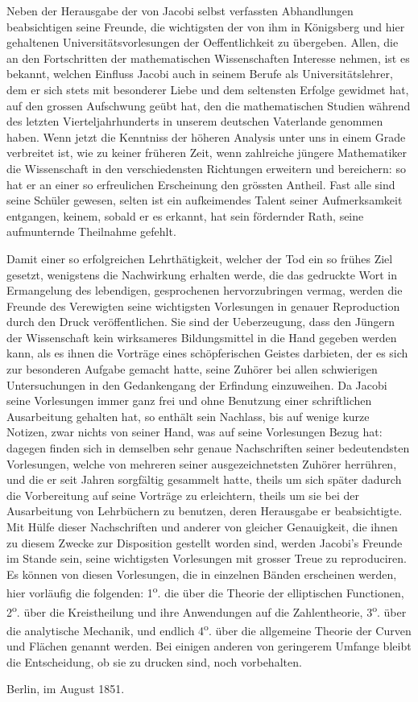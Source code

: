 \documentclass[11pt]{article}
\begin{document}
Neben der Herausgabe der von Jacobi selbst verfassten Abhandlungen beabsichtigen seine Freunde, die wichtigsten der von ihm in Königsberg und hier gehaltenen Universitätsvorlesungen der Oeffentlichkeit zu übergeben. Allen, die an den Fortschritten der mathematischen Wissenschaften Interesse nehmen, ist es bekannt, welchen Einfluss Jacobi auch in seinem Berufe als Universitätslehrer, dem er sich stets mit besonderer Liebe und dem seltensten Erfolge gewidmet hat, auf den grossen Aufschwung geübt hat, den die mathematischen Studien während des letzten Vierteljahrhunderts in unserem deutschen Vaterlande genommen haben. Wenn jetzt die Kenntniss der höheren Analysis unter uns in einem Grade verbreitet ist, wie zu keiner früheren Zeit, wenn zahlreiche jüngere Mathematiker die Wissenschaft in den verschiedensten Richtungen erweitern und bereichern: so hat er an einer so erfreulichen Erscheinung den grössten Antheil. Fast alle sind seine Schüler gewesen, selten ist ein aufkeimendes Talent seiner Aufmerksamkeit entgangen, keinem, sobald er es erkannt, hat sein fördernder Rath, seine aufmunternde Theilnahme gefehlt.

Damit einer so erfolgreichen Lehrthätigkeit, welcher der Tod ein so frühes Ziel gesetzt, wenigstens die Nachwirkung erhalten werde, die das gedruckte Wort in Ermangelung des lebendigen, gesprochenen hervorzubringen vermag, werden die Freunde des Verewigten seine wichtigsten Vorlesungen in genauer Reproduction durch den Druck veröffentlichen. Sie sind der Ueberzeugung, dass den Jüngern der Wissenschaft kein wirksameres Bildungsmittel in die Hand gegeben werden kann, als es ihnen die Vorträge eines schöpferischen Geistes darbieten, der es sich zur besonderen Aufgabe gemacht hatte, seine Zuhörer bei allen schwierigen Untersuchungen in den Gedankengang der Erfindung einzuweihen. Da Jacobi seine Vorlesungen immer ganz frei und ohne Benutzung einer schriftlichen Ausarbeitung gehalten hat, so enthält sein Nachlass, bis auf wenige kurze Notizen, zwar nichts von seiner Hand, was auf seine Vorlesungen Bezug hat: dagegen finden sich in demselben sehr genaue Nachschriften seiner bedeutendsten Vorlesungen, welche von mehreren seiner ausgezeichnetsten Zuhörer herrühren, und die er seit Jahren sorgfältig gesammelt hatte, theils um sich später dadurch die Vorbereitung auf seine Vorträge zu erleichtern, theils um sie bei der Ausarbeitung von Lehrbüchern zu benutzen, deren Herausgabe er beabsichtigte. Mit Hülfe dieser Nachschriften und anderer von gleicher Genauigkeit, die ihnen zu diesem Zwecke zur Disposition gestellt worden sind, werden Jacobi's Freunde im Stande sein, seine wichtigsten Vorlesungen mit grosser Treue zu reproduciren. Es können von diesen Vorlesungen, die in einzelnen Bänden erscheinen werden, hier vorläufig die folgenden: 1\textsuperscript{o}. die über die Theorie der elliptischen Functionen, 2\textsuperscript{o}. über die Kreistheilung und ihre Anwendungen auf die Zahlentheorie, 3\textsuperscript{o}. über die analytische Mechanik, und endlich 4\textsuperscript{o}. über die allgemeine Theorie der Curven und Flächen genannt werden. Bei einigen anderen von geringerem Umfange bleibt die Entscheidung, ob sie zu drucken sind, noch vorbehalten.

\begin{flushleft}
Berlin, im August 1851.
\end{flushleft}
\end{document}
